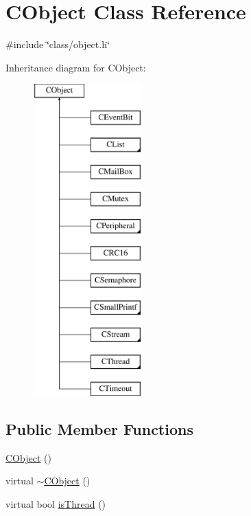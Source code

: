 \hypertarget{class_c_object}{\section{C\-Object Class Reference}
\label{class_c_object}
}


{\ttfamily \#include \char`\"{}class/object.\-h\char`\"{}}

Inheritance diagram for C\-Object\-:\begin{figure}[H]
\begin{center}
\leavevmode
\includegraphics[height=12.000000cm]{dc/dac/class_c_object}
\end{center}
\end{figure}
\subsection*{Public Member Functions}
\begin{DoxyCompactItemize}
\item 
\hyperlink{class_c_object_ac44111d5ac75248a616df61b038c4153}{C\-Object} ()
\item 
virtual \hyperlink{class_c_object_adab4f75d2863e088087cd4556f8f37ad}{$\sim$\-C\-Object} ()
\item 
virtual bool \hyperlink{class_c_object_a26a76c241a4d62d2efdac57d2cfe4c0f}{is\-Thread} ()
\end{DoxyCompactItemize}


